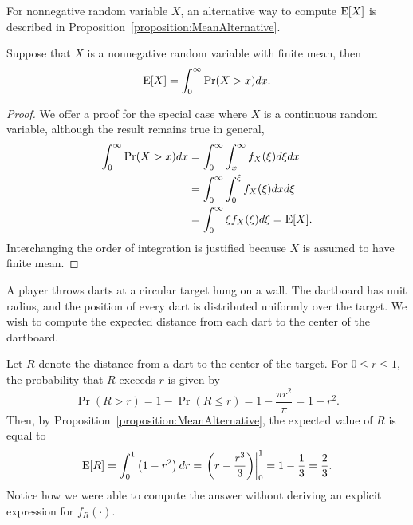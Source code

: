 For nonnegative random variable $X$, an alternative way to compute $\mathrm{E} [X]$ is described in Proposition~\ref{proposition:MeanAlternative}. 

\begin{proposition} \label{proposition:MeanAlternative}
Suppose that $X$ is a nonnegative random variable with finite mean, then
\begin{equation*}
\mathrm{E} [X] = \int_0^{\infty} \Pr (X > x) dx .
\end{equation*}
\end{proposition}
\begin{proof}
We offer a proof for the special case where $X$ is a continuous random variable, although the result remains true in general,
\begin{equation*}
\begin{split}
\int_0^{\infty} \Pr (X > x) dx
&= \int_0^{\infty} \int_x^{\infty} f_X(\xi) d\xi dx \\
&= \int_0^{\infty} \int_0^{\xi} f_X(\xi) dx d\xi \\
&= \int_0^{\infty} \xi f_X(\xi) d\xi
= \mathrm{E} [X] .
\end{split}
\end{equation*}
Interchanging the order of integration is justified because $X$ is assumed to have finite mean.
\end{proof}

\begin{example}
A player throws darts at a circular target hung on a wall.
The dartboard has unit radius, and the position of every dart is distributed uniformly over the target.
We wish to compute the expected distance from each dart to the center of the dartboard.

Let $R$ denote the distance from a dart to the center of the target.
For $0 \leq r \leq 1$, the probability that $R$ exceeds $r$ is given by
\begin{equation*}
\Pr (R > r) = 1 - \Pr (R \leq r) = 1 - \frac{\pi r^2}{\pi} = 1 - r^2 .
\end{equation*}
Then, by Proposition~\ref{proposition:MeanAlternative}, the expected value of $R$ is equal to
\begin{equation*}
\mathrm{E} [R] = \int_0^1 \left( 1 - r^2 \right) dr
= \left.  \left( r - \frac{r^3}{3} \right) \right|_0^1
= 1 - \frac{1}{3} = \frac{2}{3} .
\end{equation*}
Notice how we were able to compute the answer without deriving an explicit expression for $f_R (\cdot)$.
\end{example}

